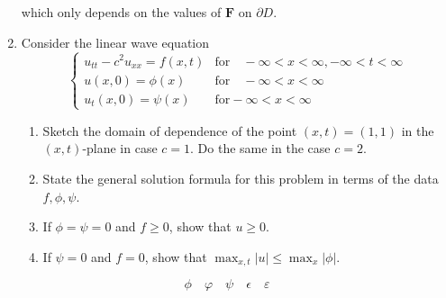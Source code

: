 \documentclass[12pt,letterpaper]{article}
\begin{document}
\begin{enumerate}
	which only depends on the values of $\mathbf F$ on $\partial D$.
	\item Consider the linear wave equation
	\[ \left\{ \begin{array}{ll} 
		u_{tt} - c^2 u_{xx} = f(x,t) & \mathrm{for} \quad - \infty < x < \infty, -\infty < t < \infty \\
		u(x,0) = \phi(x) & \mathrm{for} \quad - \infty < x < \infty	 \\
		u_t(x,0) = \psi(x) & \mathrm{for} - \infty < x < \infty
	\end{array} \right. \]
	\begin{enumerate}
		\item Sketch the domain of dependence of the point $(x,t) = (1,1)$ in the $(x,t)$-plane in case $c = 1$. Do the same in the case $c = 2$.
		\item State the general solution formula for this problem in terms of the data $f, \phi, \psi$.
		\item If $\phi = \psi = 0$ and $f \geq 0$, show that $u \geq 0$.
		\item If $\psi = 0$ and $f = 0$, show that $\max_{x,t}|u| \leq \max_x |\phi|$.
	\end{enumerate}
\end{enumerate}
\newpage

\[ \phi \quad \varphi \quad \psi \quad \epsilon \quad \varepsilon\]
\end{document}
